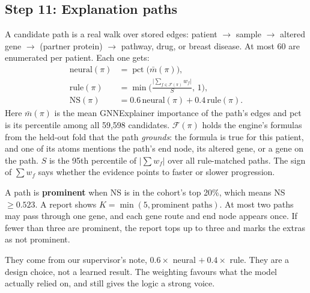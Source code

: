 \documentclass[11pt,a4paper]{article}
\begin{document}
\subsection{Step 11: Explanation paths}
A candidate path is a real walk over stored edges: patient $\to$ sample $\to$ altered gene $\to$ (partner protein) $\to$ pathway, drug, or breast disease. At most 60 are enumerated per patient. Each one gets:
\begin{align}
\text{neural}(\pi)&=\operatorname{pct}\big(\bar m(\pi)\big),\\
\text{rule}(\pi)&=\min\Big(\frac{\big|\sum_{f\in\mathcal{F}(\pi)}w_f\big|}{S},\,1\Big),\\
\text{NS}(\pi)&=0.6\,\text{neural}(\pi)+0.4\,\text{rule}(\pi).
\end{align}
Here $\bar m(\pi)$ is the mean GNNExplainer importance of the path's edges and pct is its percentile among all 59,598 candidates. $\mathcal{F}(\pi)$ holds the engine's formulas from the held-out fold that the path \emph{grounds}: the formula is true for this patient, and one of its atoms mentions the path's end node, its altered gene, or a gene on the path. $S$ is the 95th percentile of $|\sum w_f|$ over all rule-matched paths. The sign of $\sum w_f$ says whether the evidence points to faster or slower progression.

A path is \textbf{prominent} when NS is in the cohort's top 20\%, which means NS $\ge 0.523$. A report shows $K=\min(5,\text{prominent paths})$. At most two paths may pass through one gene, and each gene route and end node appears once. If fewer than three are prominent, the report tops up to three and marks the extras as not prominent.
\begin{whybox}
They come from our supervisor's note, $0.6\times$ neural $+\ 0.4\times$ rule. They are a design choice, not a learned result. The weighting favours what the model actually relied on, and still gives the logic a strong voice.
\end{whybox}
\end{document}
